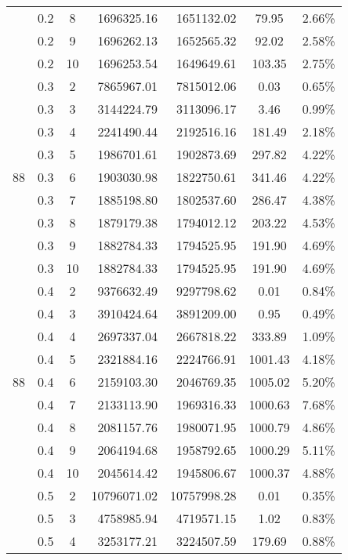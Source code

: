 {\begin{longtable}{cccrrcc}
        & 0.2   & 8     & 1696325.16 & 1651132.02 & 79.95 & 2.66\% \\
        & 0.2   & 9     & 1696262.13 & 1652565.32 & 92.02 & 2.58\% \\
        & 0.2   & 10    & 1696253.54 & 1649649.61 & 103.35 & 2.75\% \\
        & 0.3   & 2     & 7865967.01 & 7815012.06 & 0.03  & 0.65\% \\
        & 0.3   & 3     & 3144224.79 & 3113096.17 & 3.46  & 0.99\% \\
        & 0.3   & 4     & 2241490.44 & 2192516.16 & 181.49 & 2.18\% \\
        & 0.3   & 5     & 1986701.61 & 1902873.69 & 297.82  & 4.22\% \\
  88    & 0.3   & 6     & 1903030.98 & 1822750.61 & 341.46  & 4.22\% \\
        & 0.3   & 7     & 1885198.80 & 1802537.60 & 286.47  & 4.38\% \\
        & 0.3   & 8     & 1879179.38 & 1794012.12 & 203.22  & 4.53\% \\
        & 0.3   & 9     & 1882784.33 & 1794525.95 & 191.90  & 4.69\% \\
        & 0.3   & 10    & 1882784.33 & 1794525.95 & 191.90  & 4.69\% \\
        & 0.4   & 2     & 9376632.49 & 9297798.62 & 0.01  & 0.84\% \\
        & 0.4   & 3     & 3910424.64 & 3891209.00 & 0.95  & 0.49\% \\
        & 0.4   & 4     & 2697337.04 & 2667818.22 & 333.89  & 1.09\% \\
        & 0.4   & 5     & 2321884.16 & 2224766.91 & 1001.43  & 4.18\% \\
  88    & 0.4   & 6     & 2159103.30 & 2046769.35 & 1005.02  & 5.20\% \\
        & 0.4   & 7     & 2133113.90 & 1969316.33 & 1000.63  & 7.68\% \\
        & 0.4   & 8     & 2081157.76 & 1980071.95 & 1000.79  & 4.86\% \\
        & 0.4   & 9     & 2064194.68 & 1958792.65 & 1000.29  & 5.11\% \\
        & 0.4   & 10    & 2045614.42 & 1945806.67 & 1000.37  & 4.88\% \\
        & 0.5   & 2     & 10796071.02 & 10757998.28 & 0.01  & 0.35\% \\
        & 0.5   & 3     & 4758985.94 & 4719571.15 & 1.02  & 0.83\% \\
        & 0.5   & 4     & 3253177.21 & 3224507.59 & 179.69  & 0.88\% \\

\end{longtable}}
